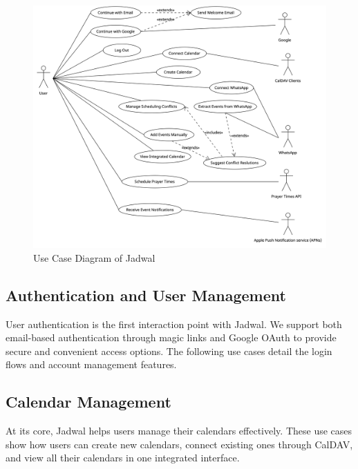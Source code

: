 \documentclass[12pt,a4paper,twoside]{report}
\begin{document}
\begin{figure}[!h]
    \centering
    \includegraphics[width=\textwidth]{images/use-case-diagram.png}
    \caption{Use Case Diagram of Jadwal}
    \label{fig:use-case-diagram}
\end{figure}

\subsection{Authentication and User Management}
User authentication is the first interaction point with Jadwal. We support both email-based authentication through magic links and Google OAuth to provide secure and convenient access options. The following use cases detail the login flows and account management features.






\subsection{Calendar Management}
At its core, Jadwal helps users manage their calendars effectively. These use cases show how users can create new calendars, connect existing ones through CalDAV, and view all their calendars in one integrated interface.




\end{document}

